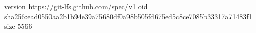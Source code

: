 version https://git-lfs.github.com/spec/v1
oid sha256:ead0550aa2b1b94e39a75680df0a98b505fd675ed5c8ce7085b33317a71483f1
size 5566
